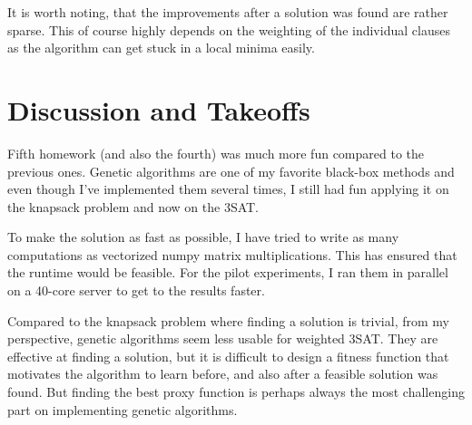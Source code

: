 \documentclass[a4paper,10pt]{article}
\begin{document}
It is worth noting, that the improvements after a solution was found are rather sparse. This of course highly depends on the weighting of the individual clauses as the algorithm can get stuck in a local minima easily.

\section{Discussion and Takeoffs}

Fifth homework (and also the fourth) was much more fun compared to the previous ones. Genetic algorithms are one of my favorite black-box methods and even though I've implemented them several times, I still had fun applying it on the knapsack problem and now on the 3SAT.

To make the solution as fast as possible, I have tried to write as many computations as vectorized numpy matrix multiplications. This has ensured that the runtime would be feasible. For the pilot experiments, I ran them in parallel on a 40-core server to get to the results faster.

Compared to the knapsack problem where finding a solution is trivial, from my perspective, genetic algorithms seem less usable for weighted 3SAT. They are effective at finding a solution, but it is difficult to design a fitness function that motivates the algorithm to learn before, and also after a feasible solution was found. But finding the best proxy function is perhaps always the most challenging part on implementing genetic algorithms.
\end{document}
